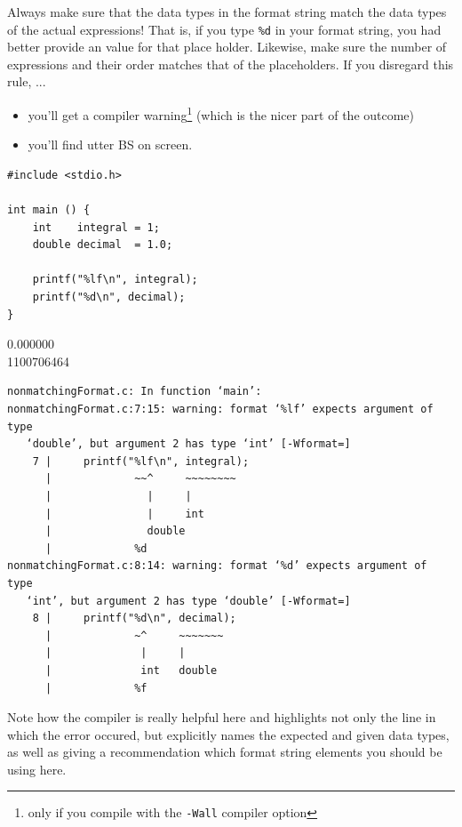 \begin{warnbox}
Always make sure that the data types in the format string match the data types of the actual expressions! That is, if you type \texttt{\%d} in your format string, you had better provide an  value for that place holder. Likewise, make sure the number of expressions and their order matches that of the placeholders. If you disregard this rule, ...
\begin{itemize}
\setlength\itemsep{0pt}
\item you'll get a compiler warning\footnote{only if you compile with the \texttt{-Wall} compiler option} (which is the nicer part of the outcome)
\item you'll find utter BS on screen.
\end{itemize}

\begin{tcbraster}[raster columns=2,
                  raster equal height,
                  nobeforeafter,
                  raster column skip=0.2cm]
\begin{warnbox}[nonmatchingFormat.c, leftupper=7mm]
\begin{verbatim}
#include <stdio.h>

int main () {
    int    integral = 1;
    double decimal  = 1.0;
    
    printf("%lf\n", integral);
    printf("%d\n", decimal);
}
\end{verbatim}
\end{warnbox}
%
\begin{cmdbox}
0.000000 \\
1100706464
\end{cmdbox}
\end{tcbraster}
%
\begin{cmdbox}
\begin{verbatim}
nonmatchingFormat.c: In function ‘main’:
nonmatchingFormat.c:7:15: warning: format ‘%lf’ expects argument of type 
   ‘double’, but argument 2 has type ‘int’ [-Wformat=]
    7 |     printf("%lf\n", integral);
      |             ~~^     ~~~~~~~~
      |               |     |
      |               |     int
      |               double
      |             %d
nonmatchingFormat.c:8:14: warning: format ‘%d’ expects argument of type 
   ‘int’, but argument 2 has type ‘double’ [-Wformat=]
    8 |     printf("%d\n", decimal);
      |             ~^     ~~~~~~~
      |              |     |
      |              int   double
      |             %f
\end{verbatim}
\end{cmdbox}

Note how the compiler is really helpful here and highlights not only the line in which the error occured, but explicitly names the expected and given data types, as well as giving a recommendation which format string elements you should be using here.
\end{warnbox}

